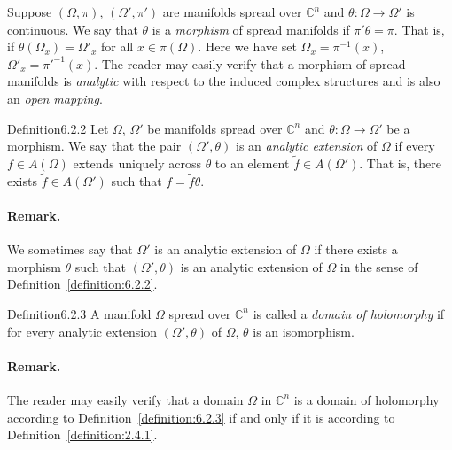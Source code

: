 Suppose $(\Omega,\pi)$, $(\Omega',\pi')$ are manifolds spread over $\mathbb C^n$ and $\theta:\Omega\to\Omega'$ is continuous. We say that $\theta$ is a \emph{morphism} of spread manifolds if $\pi'\theta=\pi$. That is, if $\theta(\Omega_x)=\Omega'_x$ for all $x\in\pi(\Omega)$. Here we have set $\Omega_x=\pi^{-1}(x)$, $\Omega'_x=\pi'^{-1}(x)$. The reader may easily verify that a morphism of spread manifolds is \emph{analytic} with respect to the induced complex structures and is also an \emph{open mapping}.
\begin{originaltheorem}{Definition}{6.2.2}
Let $\Omega$, $\Omega'$ be manifolds spread over $\mathbb C^n$ and $\theta:\Omega\to\Omega'$ be a morphism. We say that the pair $(\Omega',\theta)$ is an \emph{analytic extension} of $\Omega$ if every $f\in A(\Omega)$ extends uniquely across $\theta$ to an element $\widetilde f\in A(\Omega')$. That is, there exists $\widetilde f\in A(\Omega')$ such that $f=\widetilde f\theta$.
\end{originaltheorem}
\paragraph{Remark.} We sometimes say that $\Omega'$ is an analytic extension of $\Omega$ if there exists a morphism $\theta$ such that $(\Omega',\theta)$ is an analytic extension of $\Omega$ in the sense of Definition~\ref{definition:6.2.2}.
\begin{originaltheorem}{Definition}{6.2.3}
A manifold $\Omega$ spread over $\mathbb C^n$ is called a \emph{domain of holomorphy} if for every analytic extension $(\Omega',\theta)$ of $\Omega$, $\theta$ is an isomorphism.
\end{originaltheorem}
\paragraph{Remark.} The reader may easily verify that a domain $\Omega$ in $\mathbb C^n$ is a domain of holomorphy according to Definition~\ref{definition:6.2.3} if and only if it is according to Definition~\ref{definition:2.4.1}.

